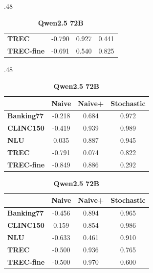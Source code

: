 \documentclass{article}
\theoremstyle{plain}
\theoremstyle{definition}
\theoremstyle{remark}
\newcommand{\banking}{Banking77\xspace}
\newcommand{\clinic}{CLINC150\xspace}
\newcommand{\trec}{TREC\xspace}
\newcommand{\trecfine}{TREC-fine\xspace}
\newcommand{\nlu}{NLU\xspace}
\newcommand{\naiveshort}{Naive\xspace}
\newcommand{\naiveplusshort}{Naive+\xspace}
\newcommand{\expshort}{Stochastic\xspace}
\begin{document}
\begin{table}[t]
\begin{subtable}{.48\textwidth}
\begin{tabular}{l c c c}
\textbf{\trec}     & -0.790 & 0.927 & 0.441 \\
\textbf{\trecfine} & -0.691 & 0.540 & 0.825 \\
\midrule[\heavyrulewidth]
\end{tabular}
\end{subtable}
\hfill
\begin{subtable}{.48\textwidth}
\caption{\textbf{Qwen2.5 32B}}
\centering
\begin{tabular}{l c c c}
\toprule
& \textbf{\naiveshort} & \textbf{\naiveplusshort} & \textbf{\expshort} \\
\midrule
\textbf{\banking}  & -0.218 & 0.684 & 0.972 \\
\textbf{\clinic}   & -0.419 & 0.939 & 0.989 \\
\textbf{\nlu}      & 0.035  & 0.887 & 0.945 \\
\textbf{\trec}     & -0.791 & 0.074 & 0.822 \\
\textbf{\trecfine} & -0.849 & 0.886 & 0.292 \\
\midrule[\heavyrulewidth]
\end{tabular}
\end{subtable}
\vspace{1em}
\begin{subtable}{\textwidth}
\caption{\textbf{Qwen2.5 72B}}
\centering
\begin{tabular}{l c c c}
\toprule
& \textbf{\naiveshort} & \textbf{\naiveplusshort} & \textbf{\expshort} \\
\midrule
\textbf{\banking}  & -0.456 & 0.894 & 0.965 \\
\textbf{\clinic}   & 0.159  & 0.854 & 0.986 \\
\textbf{\nlu}      & -0.633 & 0.461 & 0.910 \\
\textbf{\trec}     & -0.500 & 0.936 & 0.765 \\
\textbf{\trecfine} & -0.500 & 0.970 & 0.600 \\
\midrule[\heavyrulewidth]
\end{tabular}
\end{subtable}
\label{tab:qwen_stability}
\end{table}
\end{document}
